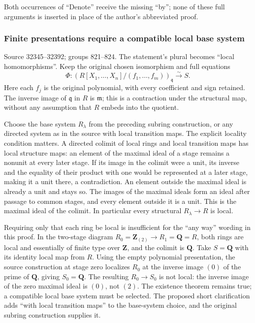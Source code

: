 Both occurrences of ``Denote'' receive the missing ``by''; none of these full arguments is inserted in place of the author's abbreviated proof.

\subsubsection{Finite presentations require a compatible local base system}\label{algebra-proof-037-finite-presentations-require-a-compatible-local-base-system}

Source 32345--32392; groups 821--824. The statement's plural becomes ``local homomorphisms''. Keep the original chosen isomorphism and full equations \[
\Phi:(R[X_1,\ldots,X_n]/(f_1,\ldots,f_m))_{\mathfrak q}\xrightarrow{\sim}S.
\] Here each \(f_j\) is the original polynomial, with every coefficient and sign retained. The inverse image of \(\mathfrak q\) in \(R\) is \(\mathfrak m\); this is a contraction under the structural map, without any assumption that \(R\) embeds into the quotient.

Choose the base system \(R_\lambda\) from the preceding subring construction, or any directed system as in the source with local transition maps. The explicit locality condition matters. A directed colimit of local rings and local transition maps has local structure maps: an element of the maximal ideal of a stage remains a nonunit at every later stage. If its image in the colimit were a unit, its inverse and the equality of their product with one would be represented at a later stage, making it a unit there, a contradiction. An element outside the maximal ideal is already a unit and stays so. The images of the maximal ideals form an ideal after passage to common stages, and every element outside it is a unit. This is the maximal ideal of the colimit. In particular every structural \(R_\lambda\to R\) is local.

Requiring only that each ring be local is insufficient for the ``any way'' wording in this proof. In the two-stage diagram \(R_0=\mathbf Z_{(2)}\to R_1=\mathbf Q=R\), both rings are local and essentially of finite type over \(\mathbf Z\), and the colimit is \(\mathbf Q\). Take \(S=\mathbf Q\) with its identity local map from \(R\). Using the empty polynomial presentation, the source construction at stage zero localizes \(R_0\) at the inverse image \((0)\) of the prime of \(\mathbf Q\), giving \(S_0=\mathbf Q\). The resulting \(R_0\to S_0\) is not local: the inverse image of the zero maximal ideal is \((0)\), not \((2)\). The existence theorem remains true; a compatible local base system must be selected. The proposed short clarification adds ``with local transition maps'' to the base-system choice, and the original subring construction supplies it.

